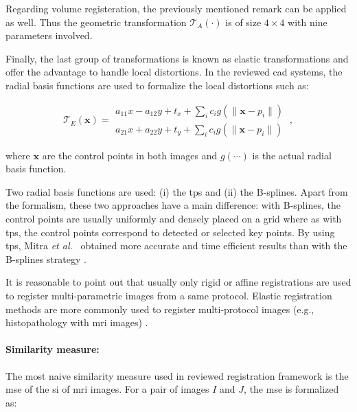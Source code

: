 Regarding volume registeration, the previously mentioned remark can be applied as well.
Thus the geometric transformation $\mathcal{T}_A(\cdot)$ is of size $4 \times 4$ with nine parameters involved.

Finally, the last group of transformations is known as elastic transformations and offer the advantage to handle local distortions.
In the reviewed \ac{cad} systems, the radial basis functions are used to formalize the local distortions such as:

\begin{equation}
	\mathcal{T}_E(\mathbf{x}) = \begin{matrix}
	a_{11} x - a_{12} y + t_x + \sum_i c_i g(\| \mathbf{x} - p_i \|) \\
	a_{21} x + a_{22} y + t_y + \sum_i c_i g(\| \mathbf{x} - p_i \|)
	\end{matrix} \ ,
\end{equation}

\noindent where $\mathbf{x}$ are the control points in both images and $g(\cdots)$ is the actual radial basis function. 

Two radial basis functions are used: (i) the \ac{tps} and (ii) the B-splines.
Apart from the formalism, these two approaches have a main difference: with B-splines, the control points are usually uniformly and densely placed on a grid where as with \ac{tps}, the control points correspond to detected or selected key points.
By using \ac{tps}, Mitra \textit{et al.}~\cite{Mitra2011} obtained more accurate and time efficient results than with the B-splines strategy \cite{Mitra2012a}.

It is reasonable to point out that usually only rigid or affine registrations are used to register multi-parametric images from a same protocol.
Elastic registration methods are more commonly used to register multi-protocol images (e.g., histopathology with \ac{mri} images) \cite{Toth2008,Toth2009}.

\paragraph{Similarity measure:}
The most naive similarity measure used in reviewed registration framework is the \acf{mse} of the \ac{si} of \ac{mri} images.
For a pair of images $I$ and $J$, the \ac{mse} is formalized as:

